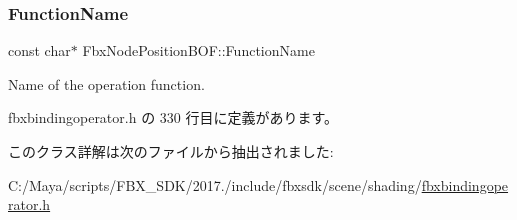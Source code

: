 \subsubsection{\texorpdfstring{Function\+Name}{FunctionName}}
{\footnotesize\ttfamily const char$\ast$ Fbx\+Node\+Position\+B\+O\+F\+::\+Function\+Name\hspace{0.3cm}{\ttfamily [static]}}



Name of the operation function. 



 fbxbindingoperator.\+h の 330 行目に定義があります。



このクラス詳解は次のファイルから抽出されました\+:\begin{DoxyCompactItemize}
\item 
C\+:/\+Maya/scripts/\+F\+B\+X\+\_\+\+S\+D\+K/2017./include/fbxsdk/scene/shading/\hyperlink{fbxbindingoperator_8h}{fbxbindingoperator.\+h}\end{DoxyCompactItemize}
